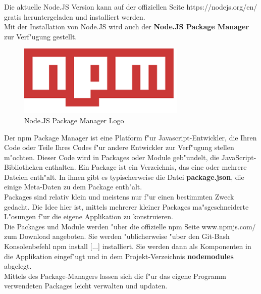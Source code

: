 \documentclass[a4paper, 11pt]{scrreprt}
\begin{document}
Die aktuelle Node.JS Version kann auf der offiziellen Seite https://nodejs.org/en/ gratis heruntergeladen und installiert werden.\\

Mit der Installation von Node.JS wird auch der \textbf{Node.JS Package Manager} zur Verf"ugung gestellt.\\

\begin{figure} [h]
\begin{center}


\includegraphics[width=8cm]{npm.png}
\caption{Node.JS Package Manager Logo}
\label{npm}

\end{center}
\end{figure}


Der npm Package Manager ist eine Platform f"ur Javascript-Entwickler, die Ihren Code oder Teile Ihres Codes f"ur andere Entwickler zur Verf"ugung stellen m"ochten. Dieser Code wird in Packages oder Module geb"undelt, die JavaScript-Bibliotheken enthalten. Ein Package ist ein Verzeichnis, das eine oder mehrere Dateien enth"alt. In ihnen gibt es typischerweise die Datei \textbf{package.json}, die einige Meta-Daten zu dem Package enth"alt. \\

Packages sind relativ klein und meistens nur f"ur einen bestimmten Zweck gedacht. Die Idee hier ist, mittels mehrerer kleiner  Packages ma"sgeschneiderte L"osungen f"ur die eigene Applikation zu konstruieren. \\

Die Packages und Module werden "uber die offizielle npm Seite www.npmjs.com/ zum Download angeboten. Sie werden "ublicherweise "uber den Git-Bash Konsolenbefehl npm install [...] installiert. Sie werden dann als Komponenten in die Applikation eingef"ugt und in dem Projekt-Verzeichnis \textbf{nodemodules} abgelegt.\\

Mittels des Package-Managers lassen sich die f"ur das eigene Programm verwendeten Packages leicht verwalten und updaten. \\
\end{document}
